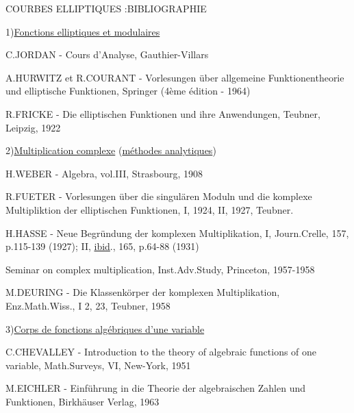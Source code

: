 \clearpage
{}
\reversemarginpar
{}
\normalmarginpar
{}

\begin{center}
COURBES ELLIPTIQUES :\quad BIBLIOGRAPHIE
\end{center}

1)\quad \uline{Fonctions elliptiques et modulaires}

C.JORDAN - Cours d'Analyse, Gauthier-Villars

A.HURWITZ et R.COURANT - Vorlesungen über allgemeine Funktionentheorie und elliptische Funktionen, Springer (4ème édition - 1964)

R.FRICKE - Die elliptischen Funktionen und ihre Anwendungen, Teubner, Leipzig, 1922

2)\quad \uline{Multiplication complexe} (\uline{méthodes analytiques})

H.WEBER - Algebra, vol.III, Strasbourg, 1908

R.FUETER - Vorlesungen über die singulären Moduln und die komplexe Multipliktion der elliptischen Funktionen, I, 1924, II, 1927, Teubner.

H.HASSE - Neue Begründung der komplexen Multiplikation, I, Journ.Crelle, 157, p.115-139 (1927); II, \uline{ibid}., 165, p.64-88 (1931)

Seminar on complex multiplication, Inst.Adv.Study, Princeton, 1957-1958

M.DEURING - Die Klassenkörper der komplexen Multiplikation, Enz.Math.Wiss., I 2, 23, Teubner, 1958

3)\quad \uline{Corps de fonctions algébriques d'une variable}

C.CHEVALLEY - Introduction to the theory of algebraic functions of one variable, Math.Surveys, VI, New-York, 1951

M.EICHLER - Einführung in die Theorie der algebraischen Zahlen und Funktionen, Birkhäuser Verlag, 1963
